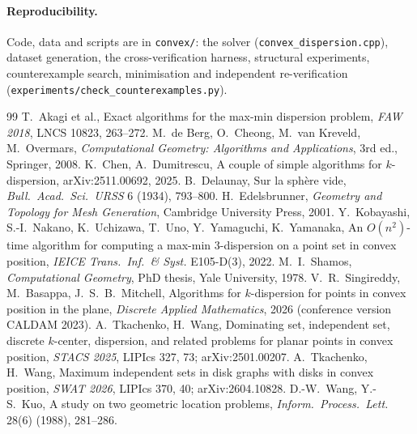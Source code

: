 \documentclass[11pt,a4paper]{article}
\theoremstyle{definition}
\begin{document}
\paragraph{Reproducibility.} Code, data and scripts are in \texttt{convex/}:
the solver (\texttt{convex\_dispersion.cpp}), dataset generation, the
cross-verification harness, structural experiments, counterexample search,
minimisation and independent re-verification
(\texttt{experiments/check\_counterexamples.py}).

\begin{thebibliography}{99}
 T.~Akagi et al., Exact algorithms for the max-min dispersion
  problem, \emph{FAW 2018}, LNCS 10823, 263--272.
 M.~de Berg, O.~Cheong, M.~van Kreveld, M.~Overmars,
  \emph{Computational Geometry: Algorithms and Applications}, 3rd ed.,
  Springer, 2008.
 K.~Chen, A.~Dumitrescu, A couple of simple algorithms for
  $k$-dispersion, arXiv:2511.00692, 2025.
 B.~Delaunay, Sur la sph\`ere vide, \emph{Bull.\ Acad.\ Sci.\
  URSS} 6 (1934), 793--800.
 H.~Edelsbrunner, \emph{Geometry and Topology for Mesh
  Generation}, Cambridge University Press, 2001.
 Y.~Kobayashi, S.-I.~Nakano, K.~Uchizawa, T.~Uno, Y.~Yamaguchi,
  K.~Yamanaka, An $O(n^2)$-time algorithm for computing a max-min 3-dispersion
  on a point set in convex position, \emph{IEICE Trans.\ Inf.\ \& Syst.}
  E105-D(3), 2022.
 M.~I.~Shamos, \emph{Computational Geometry}, PhD thesis, Yale
  University, 1978.
 V.~R.~Singireddy, M.~Basappa, J.~S.~B.~Mitchell, Algorithms for
  $k$-dispersion for points in convex position in the plane, \emph{Discrete
  Applied Mathematics}, 2026 (conference version CALDAM 2023).
 A.~Tkachenko, H.~Wang, Dominating set, independent set,
  discrete $k$-center, dispersion, and related problems for planar points in
  convex position, \emph{STACS 2025}, LIPIcs 327, 73; arXiv:2501.00207.
\bibitem{TW26} A.~Tkachenko, H.~Wang, Maximum independent sets in disk graphs
  with disks in convex position, \emph{SWAT 2026}, LIPIcs 370, 40;
  arXiv:2604.10828.
 D.-W.~Wang, Y.-S.~Kuo, A study on two geometric location
  problems, \emph{Inform.\ Process.\ Lett.} 28(6) (1988), 281--286.
\end{thebibliography}
\end{document}

